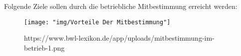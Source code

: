 Folgende Ziele sollen durch die betriebliche Mitbestimmung erreicht werden:

\begin{figure} [H]
	\centering
	\texttt{[image: "img/Vorteile Der Mitbestimmung"]}
	\caption{https://www.bwl-lexikon.de/app/uploads/mitbestimmung-im-betrieb-1.png}
	\label{fig:vorteile-der-mitbestimmung}
\end{figure}